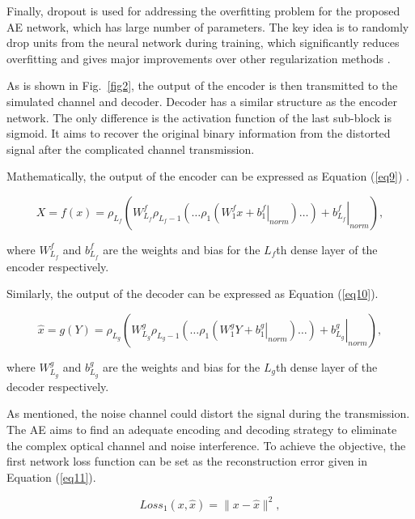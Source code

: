\documentclass[conference]{IEEEtran}
\begin{document}
Finally, dropout is used for addressing the overfitting problem for the proposed AE network, which has large number of parameters. The key idea is to randomly drop units from the neural network during training, which significantly reduces overfitting and gives major improvements over other regularization methods \cite{b35}.

As is shown in Fig.~\ref{fig2}, the output of the encoder is then transmitted to the simulated channel and decoder. Decoder has a similar structure as the encoder network. The only difference is the activation function of the last sub-block is sigmoid. It aims to recover the original binary information from the distorted signal after the complicated channel transmission.

Mathematically, the output of the encoder can be expressed as Equation (\ref{eq9}) \cite{b22}.

\begin{equation}
X = f(x) = \rho_{L_f} \left( \left. W_{L_f}^f \rho_{L_f-1} \left( \dots \rho_1 \left( \left. W_1^f x + b_1^f \right|_{norm} \right) \dots \right) + b_{L_f}^f \right|_{norm} \right),
\label{eq9}
\end{equation}

where $W_{L_f}^f$ and $b_{L_f}^f$ are the weights and bias for the $L_f$th dense layer of the encoder respectively.

Similarly, the output of the decoder can be expressed as Equation (\ref{eq10}).

\begin{equation}
\hat{x} = g(Y) = \rho_{L_g} \left( \left. W_{L_g}^g \rho_{L_g-1} \left( \dots \rho_1 \left( \left. W_1^g Y + b_1^g \right|_{norm} \right) \dots \right) + b_{L_g}^g \right|_{norm} \right),
\label{eq10}
\end{equation}

where $W_{L_g}^g$ and $b_{L_g}^g$ are the weights and bias for the $L_g$th dense layer of the decoder respectively.

As mentioned, the noise channel could distort the signal during the transmission. The AE aims to find an adequate encoding and decoding strategy to eliminate the complex optical channel and noise interference. To achieve the objective, the first network loss function can be set as the reconstruction error given in Equation (\ref{eq11}).

\begin{equation}
Loss_1(x, \hat{x}) = \|x - \hat{x}\|^2,
\label{eq11}
\end{equation}
\end{document}

